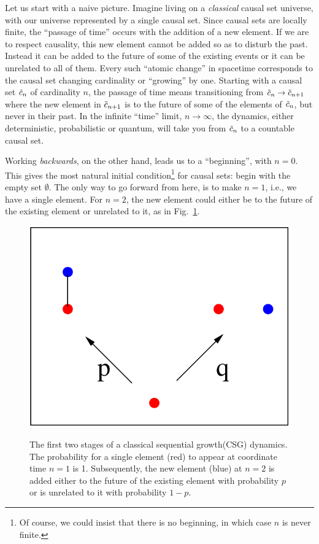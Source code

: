 Let us start with a naive picture. Imagine living on a \emph{classical} causal set
universe, with our universe represented by a single causal set.  Since causal sets are locally finite,  the ``passage of time'' occurs with the addition of a new
element. If we are to
respect causality, this new element cannot be added so as to disturb the past. Instead it can be added to the future of some of the existing events or it can be  unrelated to all of them. Every such
``atomic change'' in spacetime corresponds to the causal set changing cardinality or ``growing''  by one. Starting with a causal set 
$\tilde c_n$ of cardinality $n$, the passage of time means transitioning from  $\tilde c_n\rightarrow \tilde c_{n+1}$ where the new
element in $\tilde c_{n+1}$ is to the future of some of the elements of $\tilde c_n$, but never in their past.  In the infinite ``time'' limit,  $n\rightarrow
\infty$, the dynamics, either deterministic, probabilistic or quantum, will take you from $\tilde c_n$ to a countable causal
set. 

Working  \emph{backwards}, on the other hand, leads us  to a ``beginning'', with $n=0$. This gives the most natural
initial condition\footnote{Of course, we could insist that there is no beginning,  in which case $n$ is never finite.}  for
causal sets: begin with the empty set $\emptyset$.  The only way to go forward from here, is to
make $n=1$, i.e., we have  a single element. For $n=2$, the new element could either be to the future of the existing
element or unrelated to it, as in Fig.~\ref{growthtwo.fig}. 

\begin{figure}[ht]
  \centering \resizebox{2in}{!} {\includegraphics[width=\textwidth]{growthtwo}} 
  \caption{The first two stages of a classical sequential growth(CSG)  dynamics. The probability for a single element
      (red) 
    to appear at coordinate time $n=1$ is 1. Subsequently, the new element (blue) at $n=2$ is added either to the future of the
  existing element with probability $p$ or is unrelated to it with probability $1-p$.}
\label{growthtwo.fig}
\end{figure}

